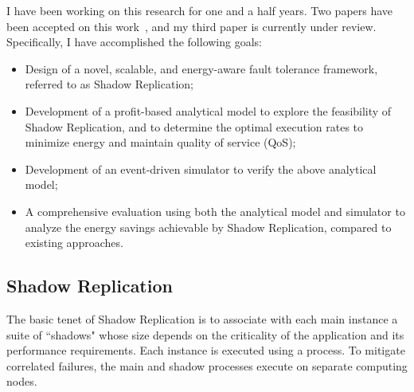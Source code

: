 
I have been working on this research for one and a half years.
Two papers have been accepted on this work~\cite{cui_en7085151,cui_closer_2014},
and my third paper is currently under review.
Specifically, I have accomplished the following goals:
\begin{itemize}
	\item Design of a novel, scalable, and energy-aware fault tolerance framework, referred to as Shadow Replication;

	\item Development of a profit-based analytical model to explore the feasibility of
	  Shadow Replication, and to determine the optimal
	  execution rates to minimize energy and maintain quality of service (QoS);

	\item Development of an event-driven simulator to verify the above analytical model;

	\item A comprehensive evaluation using both the analytical model and simulator to analyze the
	energy savings achievable by Shadow Replication, compared to existing approaches.
\end{itemize}


\subsection{Shadow Replication}
The basic tenet of Shadow Replication is to associate with each main instance a suite of ``shadows" whose size depends on the criticality of the application and its performance requirements. Each instance is executed using a process. 
To mitigate correlated failures, the main and shadow processes
execute on separate computing nodes.

